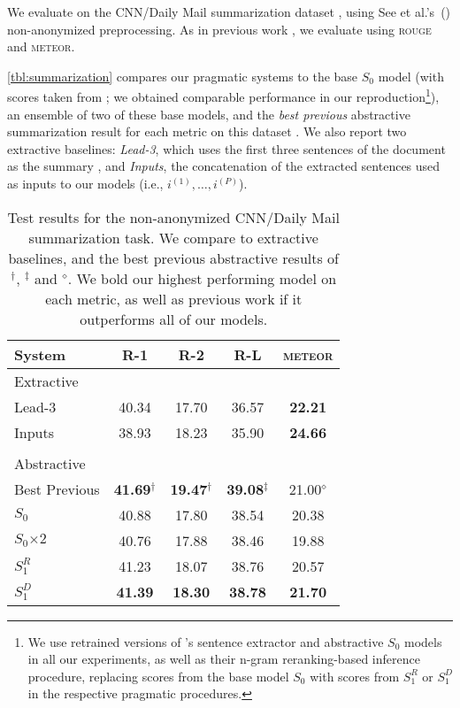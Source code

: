 \documentclass[11pt,a4paper]{article}
\newcommand{\basespk}[0]{$S_0$\xspace}
\newcommand{\pragd}[0]{$S_1^D$\xspace}
\newcommand{\pragr}[0]{$S_1^R$\xspace}
\newcommand{\meteor}{\textsc{meteor}\xspace}
\newcommand{\rouge}{\textsc{rouge}\xspace}
\newcommand{\phan}{\phantom{$^\dagger$}}
\newcommand{\ie}{i.e., }
\begin{document}
We evaluate on the CNN/Daily Mail summarization dataset \cite{hermann2015teaching,nallapati2016abstractive}, using See et al.'s~(\citeyear{see2017summarization}) non-anonymized preprocessing. As in previous work \cite{chen2018fast},  we evaluate using \rouge and \meteor.

\autoref{tbl:summarization} compares our pragmatic systems to the base \basespk model (with scores taken from \citet{chen2018fast}; we obtained comparable performance in our reproduction\footnote{We use retrained versions of \citet{chen2018fast}'s sentence extractor and abstractive \basespk models in all our experiments, as well as their n-gram reranking-based inference procedure, replacing scores from the base model \basespk with scores from \pragr or \pragd in the respective pragmatic procedures.}), an ensemble of two of these base models, and the \emph{best previous} abstractive summarization result for each metric on this dataset \cite{celikyilmaz2018communicating,paulus2018summarization,chen2018fast}.
We also report two extractive baselines: \emph{Lead-3}, which uses the first three sentences of the document as the summary \cite{see2017summarization}, and \emph{Inputs}, the concatenation of the extracted sentences 
used as inputs to our models (\ie $i^{(1)}, \ldots, i^{(P)}$).


\begin{table}[t]
\centering
\small
\begin{tabular}{lcccc}
\toprule
System & R-1 & R-2 & R-L & \meteor \\
\midrule
Extractive \\
\midrule
Lead-3 & 40.34\phan & 17.70\phan & 36.57\phan & {\bf 22.21}\phan \\
Inputs & 38.93\phan & 18.23\phan & 35.90\phan & {\bf 24.66}\phan \\
\\
Abstractive \\
\midrule
Best Previous & {\bf 41.69}$^\dagger$ & {\bf 19.47}$^\dagger$ & {\bf 39.08}$^\ddagger$ & 21.00$^\diamond$ \\
\midrule
\basespk & 40.88\phan & 17.80\phan & 38.54\phan & 20.38\phan \\ \basespk $\times 2$  & 40.76\phan & 17.88\phan & 38.46\phan & 19.88\phan \\ \pragr & 41.23\phan & 18.07\phan & 38.76\phan & 20.57\phan \\ \pragd & {\bf 41.39}\phan & {\bf 18.30}\phan & {\bf 38.78}\phan & {\bf 21.70}\phan \\ \bottomrule
\end{tabular}
\caption{\label{tbl:summarization}Test results for the non-anonymized CNN/Daily Mail summarization task. We compare to extractive baselines, and the best previous abstractive results of $^\dagger$\citet{celikyilmaz2018communicating},
$^\ddagger$\citet{paulus2018summarization} and $^\diamond$\citet{chen2018fast}.
We bold our highest performing model on each metric, as well as previous work if it outperforms all of our models.
}
\end{table}
\end{document}
